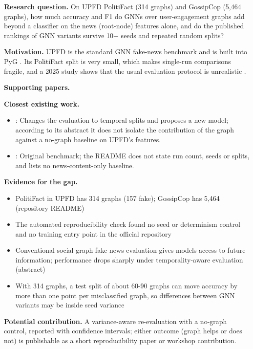 \documentclass[11pt,a4paper]{article}
\begin{document}
\textbf{Research question.} On UPFD PolitiFact (314 graphs) and GossipCop (5,464 graphs), how much accuracy and F1 do GNNs over user-engagement graphs add beyond a classifier on the news (root-node) features alone, and do the published rankings of GNN variants survive 10+ seeds and repeated random splits?

\textbf{Motivation.} UPFD is the standard GNN fake-news benchmark and is built into PyG \cite{dou2021upfd}. Its PolitiFact split is very small, which makes single-run comparisons fragile, and a 2025 study shows that the usual evaluation protocol is unrealistic \cite{kim2025dawn}.

\textbf{Supporting papers.} \cite{dou2021upfd,phan2023fakesurvey,gong2023fakesurvey}

\textbf{Closest existing work.}
\begin{itemize}
\item \cite{kim2025dawn}: Changes the evaluation to temporal splits and proposes a new model; according to its abstract it does not isolate the contribution of the graph against a no-graph baseline on UPFD's features.
\item \cite{dou2021upfd}: Original benchmark; the README does not state run count, seeds or splits, and lists no news-content-only baseline.
\end{itemize}

\textbf{Evidence for the gap.}
\begin{itemize}
\item [V] PolitiFact in UPFD has 314 graphs (157 fake); GossipCop has 5,464 (repository README) \cite{dou2021upfd}
\item [V] The automated reproducibility check found no seed or determinism control and no training entry point in the official repository \cite{dou2021upfd}
\item [V] Conventional social-graph fake news evaluation gives models access to future information; performance drops sharply under temporality-aware evaluation (abstract) \cite{kim2025dawn}
\item [E] With 314 graphs, a test split of about 60-90 graphs can move accuracy by more than one point per misclassified graph, so differences between GNN variants may be inside seed variance
\end{itemize}

\textbf{Potential contribution.} A variance-aware re-evaluation with a no-graph control, reported with confidence intervals; either outcome (graph helps or does not) is publishable as a short reproducibility paper or workshop contribution.
\end{document}
